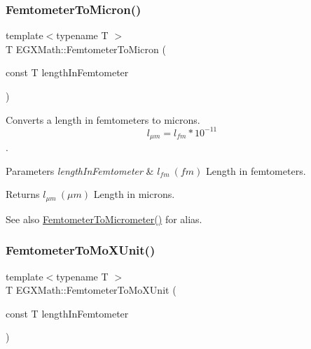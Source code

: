 \subsubsection{\texorpdfstring{Femtometer\+To\+Micron()}{FemtometerToMicron()}}
{\footnotesize\ttfamily template$<$typename T $>$ \\
T E\+G\+X\+Math\+::\+Femtometer\+To\+Micron (\begin{DoxyParamCaption}\item[{const T}]{length\+In\+Femtometer }\end{DoxyParamCaption})}



Converts a length in femtometers to microns. \[ l_{\mu m}=l_{fm} * 10^{-11} \]. 


\begin{DoxyParams}{Parameters}
{\em length\+In\+Femtometer} & $ l_{fm}\ (fm)$ Length in femtometers. \\
\hline
\end{DoxyParams}
\begin{DoxyReturn}{Returns}
$ l_{\mu m}\ (\mu m)$ Length in microns. 
\end{DoxyReturn}
\begin{DoxySeeAlso}{See also}
\mbox{\hyperlink{group___e_g_x_math-_conversions-_length_conversions-_s_i-_femtometer-_s_i_gac965667884f7a3449072effb83260fe8}{Femtometer\+To\+Micrometer()}} for alias. 
\end{DoxySeeAlso}
\mbox{\label{group___e_g_x_math-_conversions-_length_conversions-_s_i-_femtometer-_non-_s_i_ga57801d7c681362c1a11053233e31c415}} 
\subsubsection{\texorpdfstring{Femtometer\+To\+Mo\+X\+Unit()}{FemtometerToMoXUnit()}}
{\footnotesize\ttfamily template$<$typename T $>$ \\
T E\+G\+X\+Math\+::\+Femtometer\+To\+Mo\+X\+Unit (\begin{DoxyParamCaption}\item[{const T}]{length\+In\+Femtometer }\end{DoxyParamCaption})}



